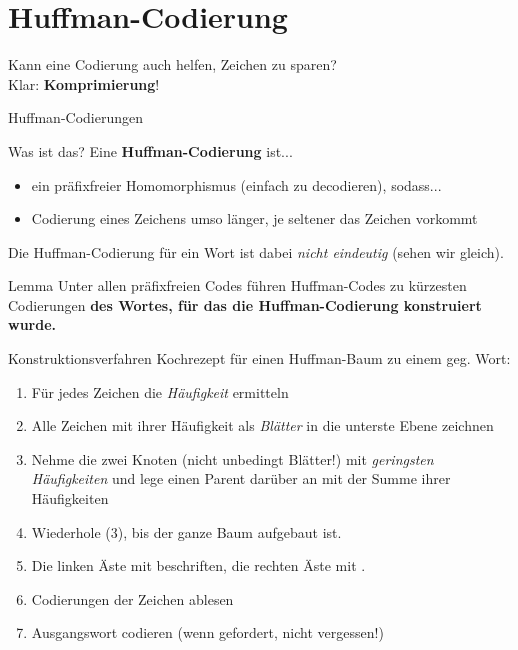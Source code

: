 \section{Huffman-Codierung}

\begin{frame}
	Kann eine Codierung auch helfen, Zeichen zu sparen? \\
	\pause
	\impl Klar: \textbf{Komprimierung}!
\end{frame}


\begin{frame}{Huffman-Codierungen}
	\begin{block}{Was ist das?}
		Eine \textbf{Huffman-Codierung} ist...
		\begin{itemize}
			\item ein präfixfreier Homomorphismus {\small (\impl einfach zu decodieren)}, sodass...
			\item Codierung eines Zeichens umso länger, je seltener das Zeichen vorkommt
		\end{itemize}
	\end{block}
	
	Die Huffman-Codierung für ein Wort ist dabei \textit{nicht eindeutig} (sehen wir gleich).
	\pause
	\begin{block}{Lemma}
		Unter allen präfixfreien Codes führen Huffman-Codes zu kürzesten Codierungen
		\textbf{des Wortes, für das die Huffman-Codierung konstruiert wurde.}
	\end{block}
\end{frame}

\begin{frame}{Konstruktionsverfahren}
	Kochrezept für einen Huffman-Baum zu einem geg. Wort:
	\begin{enumerate}
		\item Für jedes Zeichen die \emph{Häufigkeit} ermitteln
		\item Alle Zeichen mit ihrer Häufigkeit als \emph{Blätter} in die unterste Ebene zeichnen
		\item Nehme die zwei Knoten {\small (nicht unbedingt Blätter!)} mit \emph{geringsten Häufigkeiten} und lege einen Parent darüber an mit der Summe ihrer Häufigkeiten
		\item Wiederhole (3), bis der ganze Baum aufgebaut ist.
		\item Die linken Äste mit  beschriften, die rechten Äste mit .
		\item Codierungen der Zeichen ablesen
		\item Ausgangswort codieren (wenn gefordert, nicht vergessen!)
	\end{enumerate}
\end{frame}

